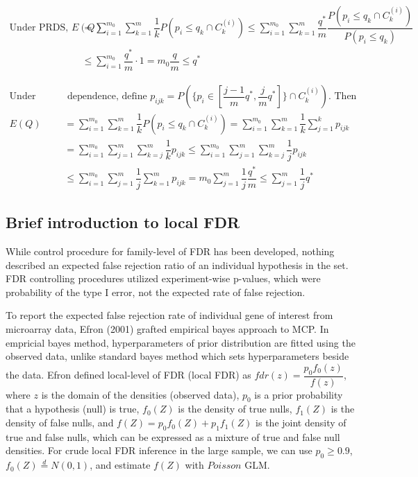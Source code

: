 \documentclass[a4paper, 11pt, oneside]{article}
\begin{document}
\begin{equation}
\begin{aligned}\label{proof-by2}
\text{Under PRDS, } E(Q)&=\sum_{i=1}^{m_0} \sum_{k=1}^m \dfrac{1}{k}P(p_i \leq q_k \cap C_k^{(i)}) \leq \sum_{i=1}^{m_0} \sum_{k=1}^m \dfrac{q^*}{m} \dfrac{P(p_i \leq q_k \cap C_k^{(i)})}{P(p_i \leq q_k)}\\
& \leq \sum_{i=1}^{m_0} \dfrac{q^*}{m} \cdot 1 = m_0 \dfrac{q}{m} \leq q^*
\end{aligned}
\end{equation}

\begin{equation}
\begin{aligned}\label{proof-by3}
\text{Under arbitraty} &\text{ dependence, define } p_{ijk}=P(\{ p_i \in [\dfrac{j-1}{m}q^*, \dfrac{j}{m}q^*]\} \cap C_k^{(i)}). \text{ Then}\\ 
E(Q)&=\sum_{i=1}^{m_0} \sum_{k=1}^m \dfrac{1}{k}P(p_i \leq q_k \cap C_k^{(i)}) = \sum_{i=1}^{m_0} \sum_{k=1}^{m} \dfrac{1}{k} \sum_{j=1}^{k} p_{ijk}\\
& = \sum_{i=1}^{m_0} \sum_{j=1}^{m} \sum_{k=j}^{m} \dfrac{1}{k}p_{ijk} \leq \sum_{i=1}^{m_0} \sum_{j=1}^{m} \sum_{k=j}^{m} \dfrac{1}{j}p_{ijk} \\
& \leq \sum_{i=1}^{m_0} \sum_{j=1}^{m} \dfrac{1}{j} \sum_{k=1}^{m} p_{ijk} = m_0 \sum_{j=1}^{m} \dfrac{1}{j} \dfrac{q^*}{m} \leq \sum_{j=1}^m \dfrac{1}{j} q^*
\end{aligned}
\end{equation}

\subsection{Brief introduction to local FDR}
While control procedure for family-level of FDR has been developed, nothing described an expected false rejection ratio of an individual hypothesis in the set. FDR controlling procedures utilized experiment-wise p-values, which were probability of the type I error, not the expected rate of false rejection. \par
    To report the expected false rejection rate of individual gene of interest from microarray data, Efron (2001) grafted empirical bayes approach to MCP. In empricial bayes method, hyperparameters of prior distribution are fitted using the observed data, unlike standard bayes method which sets hyperparameters beside the data. Efron defined local-level of FDR (local FDR) as $fdr(z)=\dfrac{p_0 f_0(z)}{f(z)}$, where $z$ is the domain of the densities (observed data), $p_0$ is a prior probability that a hypothesis (null) is true, $f_0(Z)$ is the density of true nulls, $f_1(Z)$ is the density of false nulls, and $f(Z)=p_0f_0(Z) + p_1f_1(Z)$ is the joint density of true and false nulls, which can be expressed as a mixture of true and false null densities. For crude local FDR inference in the large sample, we can use $p_0 \geq 0.9$, $f_0(Z) \stackrel{d}{=} N(0, 1)$, and estimate $f(Z)$ with $Poisson$ GLM.
\end{document}

